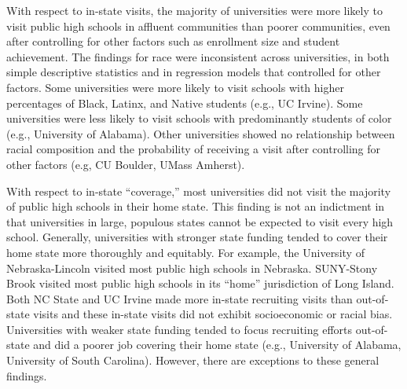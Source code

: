 \documentclass[twoside]{article}
\begin{document}
With respect to in-state visits, the majority of universities were more likely to visit public high schools in affluent communities than poorer communities, even after controlling for other factors such as enrollment size and student achievement. The findings for race were inconsistent across universities, in both simple descriptive statistics and in regression models that controlled for other factors. Some universities were more likely to visit schools with higher percentages of Black, Latinx, and Native students (e.g., UC Irvine). Some universities were less likely to visit schools with predominantly students of color (e.g., University of Alabama). Other universities showed no relationship between racial composition and the probability of receiving a visit after controlling for other factors (e.g, CU Boulder, UMass Amherst).



With respect to in-state ``coverage,'' most universities did not visit the majority of public high schools in their home state.  This finding is not an indictment in that universities in large, populous states cannot be expected to visit every high school. Generally, universities with stronger state funding tended to cover their home state more thoroughly and equitably. For example, the University of Nebraska-Lincoln visited most public high schools in Nebraska. SUNY-Stony Brook visited most public high schools in its ``home'' jurisdiction of Long Island. Both NC State and UC Irvine made more in-state recruiting visits than out-of-state visits and these in-state visits did not exhibit socioeconomic or racial bias. Universities with weaker state funding tended to focus recruiting efforts out-of-state and did a poorer job covering their home state (e.g., University of Alabama, University of South Carolina). However, there are exceptions to these general findings.
\end{document}
